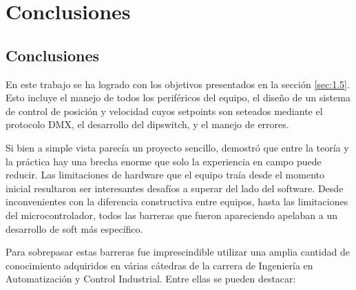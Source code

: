 \chapter{Conclusiones}
\thispagestyle{empty}

\section{Conclusiones} \label{sec:\thesection}
En este trabajo se ha logrado  con los objetivos presentados en la sección \ref{sec:1.5}. Esto incluye el manejo de todos los periféricos del equipo, el diseño de un sistema de control de posición y velocidad cuyos setpoints son seteados mediante el protocolo DMX, el desarrollo del dipswitch, y el manejo de errores.


Si bien a simple vista parecía un proyecto sencillo, demostró que entre la teoría y la práctica hay una brecha enorme que solo la experiencia en campo puede reducir. Las limitaciones de hardware que el equipo traía desde el momento inicial resultaron ser interesantes desafíos a superar del lado del software. Desde inconvenientes con la diferencia constructiva entre equipos, hasta las limitaciones del microcontrolador, todos las barreras que fueron apareciendo apelaban a un desarrollo de soft más específico.

Para sobrepasar estas barreras fue  imprescindible utilizar una amplia cantidad de conocimiento adquiridos en várias cátedras de la carrera de Ingeniería en Automatización y Control Industrial. Entre ellas se pueden destacar:

